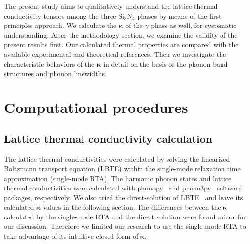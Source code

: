 \documentclass[twocolumn,amsmath,amssymb,a4paper,prb,superscriptaddress,floatfix]{revtex4-1}
\begin{document}
The present study aims to qualitatively understand the lattice thermal
conductivity tensors among the three Si$_3$N$_4$ phases by means of the first
principles approach.  We calculate the $\boldsymbol{\kappa}$ of the $\gamma$
phase as well, for systematic understanding. After the methodology section, we
examine the validity of the present results first.  Our calculated thermal
properties are compared with the available experimental and theoretical
references.  Then we investigate the characteristic behaviors of the 
$\boldsymbol{\kappa}$ in detail on the basis of the phonon band structures and
phonon linewidths.

\section{Computational procedures}

\subsection{Lattice thermal conductivity calculation}

The lattice thermal conductivities were calculated by solving the linearized
Boltzmann transport equation (LBTE) within the single-mode relaxation time
approximation (single-mode RTA).  The harmonic phonon states and lattice thermal conductivities were
calculated with phonopy~\cite{phonopy} and phono3py~\cite{phono3py} software packages, respectively.
We also tried the
direct-solution of LBTE~\cite{chaput-direct} and leave its calculated
$\boldsymbol{\kappa}$ values in the following section. The differences between
the $\boldsymbol{\kappa}$ calculated by the single-mode RTA and the direct
solution were found minor for our discussion. Therefore we limited our research
to use the single-mode RTA to take advantage of its intuitive closed form of
$\boldsymbol{\kappa}$.
\end{document}
